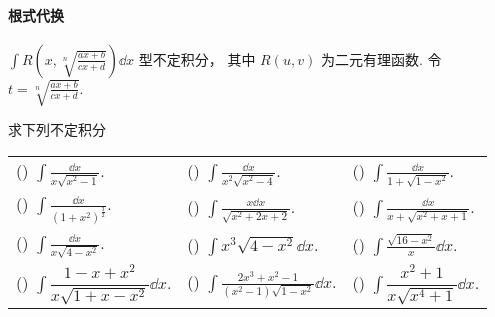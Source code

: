 \paragraph{根式代换}
$\displaystyle \int R\left(x, \sqrt[n]{\frac{a x+b}{c x+d}}\right) \dd  x $ 型不定积分，
其中 $ R(u, v) $ 为二元有理函数. 令 $\displaystyle t=\sqrt[n]{\frac{a x+b}{c x+d}} .$
\begin{example}
    求下列不定积分
    \setcounter{magicrownumbers}{0}
    \begin{table}[H]
        \centering
        \begin{tabular}{l | l | l}
            (\rownumber{}) $\displaystyle\int\frac{\dd x}{x\sqrt{x^2-1}}.$                    & (\rownumber{}) $\displaystyle\int\frac{\dd x}{x^2\sqrt{x^2-4}}.$                          & (\rownumber{}) $\displaystyle\int\frac{\dd x}{1+\sqrt{1-x^2}}.$      \\
            (\rownumber{}) $\displaystyle\int\frac{\dd x}{\left(1+x^2\right)^{\frac{3}{2}}}.$ & (\rownumber{}) $\displaystyle\int\frac{x\dd x}{\sqrt{x^2+2x+2}}.$                         & (\rownumber{}) $\displaystyle\int\frac{\dd x}{x+\sqrt{x^2+x+1}}.$    \\
            (\rownumber{}) $\displaystyle\int\frac{\dd x}{x\sqrt{4-x^2}}.$                    & (\rownumber{}) $\displaystyle\int x^3\sqrt{4-x^2}\dd x.$                                  & (\rownumber{}) $\displaystyle\int\frac{\sqrt{16-x^2}}{x}\dd x.$      \\
            (\rownumber{}) $\displaystyle\int\dfrac{1-x+x^2}{x\sqrt{1+x-x^2}}\dd x.$          & (\rownumber{}) $\displaystyle\int\frac{2x^3+x^2-1}{\left(x^2-1\right)\sqrt{1-x^2}}\dd x.$ & (\rownumber{}) $\displaystyle\int\dfrac{x^2+1}{x\sqrt{x^4+1}}\dd x.$
        \end{tabular}
    \end{table}
\end{example}
